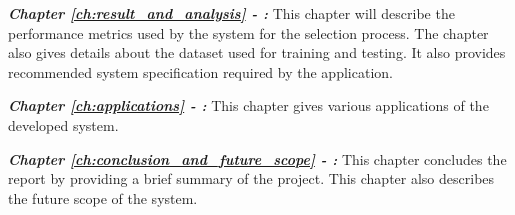 \textbf{\textit{Chapter \ref{ch:result_and_analysis} - :}}
This chapter will describe the performance metrics used by the system for the selection process. The chapter also gives details about the dataset used for training and testing. It also provides recommended system specification required by the application.

\textbf{\textit{Chapter \ref{ch:applications} - :}}
This chapter gives various applications of the developed system.

\textbf{\textit{Chapter \ref{ch:conclusion_and_future_scope} - :}}
This chapter concludes the report by providing a brief summary of the project. This chapter also describes the future scope of the system.
